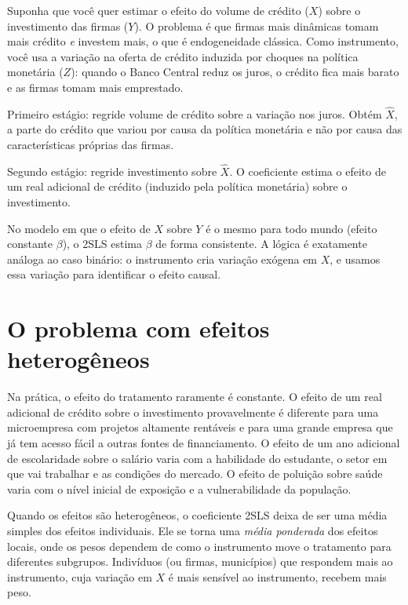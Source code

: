 \begin{exemplobox}
Suponha que você quer estimar o efeito do volume de crédito ($X$) sobre o investimento das firmas ($Y$). O problema é que firmas mais dinâmicas tomam mais crédito \textit{e} investem mais, o que é endogeneidade clássica. Como instrumento, você usa a variação na oferta de crédito induzida por choques na política monetária ($Z$): quando o Banco Central reduz os juros, o crédito fica mais barato e as firmas tomam mais emprestado.

Primeiro estágio: regride volume de crédito sobre a variação nos juros. Obtém $\widehat{X}$, a parte do crédito que variou por causa da política monetária e não por causa das características próprias das firmas.

Segundo estágio: regride investimento sobre $\widehat{X}$. O coeficiente estima o efeito de um real adicional de crédito (induzido pela política monetária) sobre o investimento.
\end{exemplobox}

No modelo em que o efeito de $X$ sobre $Y$ é o mesmo para todo mundo (efeito constante $\beta$), o 2SLS estima $\beta$ de forma consistente. A lógica é exatamente análoga ao caso binário: o instrumento cria variação exógena em $X$, e usamos essa variação para identificar o efeito causal.

\section{O problema com efeitos heterogêneos}
\label{sec:heterogeneidade_continuo}

Na prática, o efeito do tratamento raramente é constante. O efeito de um real adicional de crédito sobre o investimento provavelmente é diferente para uma microempresa com projetos altamente rentáveis e para uma grande empresa que já tem acesso fácil a outras fontes de financiamento. O efeito de um ano adicional de escolaridade sobre o salário varia com a habilidade do estudante, o setor em que vai trabalhar e as condições do mercado. O efeito de poluição sobre saúde varia com o nível inicial de exposição e a vulnerabilidade da população.

Quando os efeitos são heterogêneos, o coeficiente 2SLS deixa de ser uma média simples dos efeitos individuais. Ele se torna uma \textit{média ponderada} dos efeitos locais, onde os pesos dependem de como o instrumento move o tratamento para diferentes subgrupos. Indivíduos (ou firmas, municípios) que respondem mais ao instrumento, cuja variação em $X$ é mais sensível ao instrumento, recebem mais peso.

